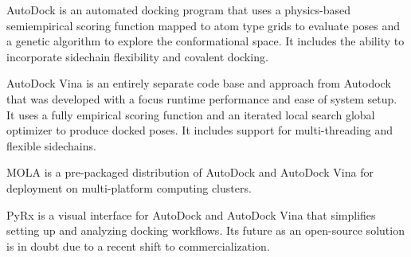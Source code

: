 AutoDock \cite{Morris_2009} is an automated docking program that uses a physics-based semiempirical scoring function \cite{Huey_2007} mapped to atom type grids to evaluate poses and a genetic algorithm to explore the conformational space.  It includes the ability to incorporate sidechain flexibility and covalent docking.

AutoDock Vina \cite{Trott_2009} is an entirely separate code base and approach from Autodock that was developed with a focus runtime performance and ease of system setup. It uses a fully empirical scoring function and an iterated local search global optimizer to produce docked poses. It includes support for multi-threading and flexible sidechains.

MOLA \cite{Abreu_2010} is a pre-packaged distribution of AutoDock and AutoDock Vina for deployment on multi-platform computing clusters.

PyRx \cite{Dallakyan_2014} is a visual interface for AutoDock and AutoDock Vina that simplifies setting up and analyzing docking workflows.  Its future as an open-source solution is in doubt due to a recent shift to commercialization.
